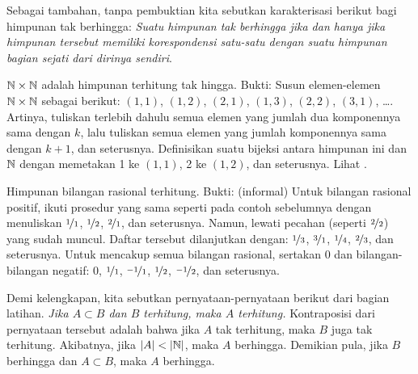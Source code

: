 Sebagai tambahan, tanpa pembuktian kita sebutkan karakterisasi berikut
bagi himpunan tak berhingga: \emph{Suatu himpunan tak berhingga jika dan hanya jika himpunan tersebut memiliki
korespondensi satu-satu dengan suatu himpunan bagian sejati dari dirinya sendiri}.

\begin{example}
$\N \times \N$ adalah himpunan terhitung tak hingga.  Bukti: Susun
elemen-elemen $\N \times \N$ sebagai berikut:
$(1,1)$, $(1,2)$, $(2,1)$, $(1,3)$, $(2,2)$, $(3,1)$, \ldots.  Artinya,
tuliskan terlebih dahulu semua elemen yang jumlah dua komponennya sama dengan $k$,
lalu tuliskan semua elemen yang jumlah komponennya sama dengan $k+1$, dan seterusnya.
Definisikan suatu bijeksi antara himpunan ini dan ${\mathbb{N}}$ dengan memetakan 1 ke $(1,1)$,
2 ke $(1,2)$, dan seterusnya.  Lihat .
\begin{myfigureht}
\caption{Menunjukkan bahwa $\N \times \N$ terhitung.\label{fig:NcrossNcard}}
\end{myfigureht}
\end{example}

\begin{example}
Himpunan bilangan rasional terhitung.  Bukti: (informal)
Untuk bilangan rasional positif, ikuti prosedur yang sama
seperti pada contoh sebelumnya dengan menuliskan
$\nicefrac{1}{1}$, $\nicefrac{1}{2}$, $\nicefrac{2}{1}$, dan seterusnya.  Namun,
lewati pecahan (seperti $\nicefrac{2}{2}$)
yang sudah muncul.  Daftar tersebut dilanjutkan dengan:
$\nicefrac{1}{3}$, $\nicefrac{3}{1}$, $\nicefrac{1}{4}$,
$\nicefrac{2}{3}$, dan seterusnya.
Untuk mencakup semua bilangan rasional, sertakan $0$ dan bilangan-bilangan negatif:
$0$,
$\nicefrac{1}{1}$,
$\nicefrac{-1}{1}$,
$\nicefrac{1}{2}$,
$\nicefrac{-1}{2}$, dan seterusnya.
\end{example}

Demi kelengkapan, kita sebutkan pernyataan-pernyataan berikut
dari bagian latihan.
\emph{Jika $A \subset
B$ dan $B$ terhitung, maka $A$ terhitung.}  Kontraposisi dari
pernyataan tersebut adalah bahwa jika $A$
tak terhitung, maka $B$ juga tak terhitung.
Akibatnya, jika $\lvert {A} \rvert < \lvert {{\mathbb{N}}} \rvert$, maka $A$
berhingga.
Demikian pula, jika $B$ berhingga dan $A \subset B$, maka $A$ berhingga.

